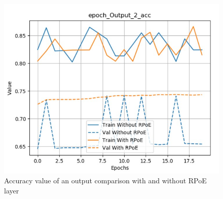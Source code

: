 \documentclass[12pt]{report}
\begin{document}
\begin{figure}[htbp]
\begin{minipage}{0.5 \textwidth}
\begin{center}
            \includegraphics[width=\textwidth]{images/experiences/rpoe-rnn/acc-output-comparison-rpoe.jpg}
            \caption{Accuracy value of an output comparison with and without RPoE layer}
            \label{fig:acc-output-comparison-rpoe}
        \end{center}
    \end{minipage}
\end{figure}
\end{document}
